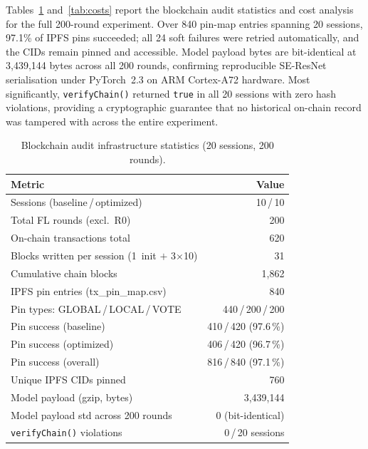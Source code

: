 \documentclass{llncs}
\begin{document}
Tables~\ref{tab:audit_stats} and~\ref{tab:costs} report the blockchain audit
statistics and cost analysis for the full 200-round experiment. Over 840
pin-map entries spanning 20 sessions, 97.1\% of IPFS pins succeeded; all 24 soft failures were retried automatically, and the CIDs remain pinned and
accessible. Model payload bytes are bit-identical at 3{,}439{,}144 bytes
across all 200 rounds, confirming reproducible SE-ResNet serialisation under
PyTorch~2.3 on ARM Cortex-A72 hardware. Most significantly, \texttt{verifyChain()}
returned \texttt{true} in all 20 sessions with zero hash violations, providing
a cryptographic guarantee that no historical on-chain record was tampered with
across the entire experiment.

\begin{table}[t]
\caption{Blockchain audit infrastructure statistics (20 sessions, 200 rounds).}
\label{tab:audit_stats}
\centering\footnotesize
\setlength{\tabcolsep}{4pt}
\begin{tabular}{lr}
\toprule
\textbf{Metric} & \textbf{Value} \\
\midrule
Sessions (baseline\,/\,optimized) & 10\,/\,10 \\
Total FL rounds (excl.\ R0) & 200 \\
On-chain transactions total & 620 \\
Blocks written per session (1~init $+$ 3$\times$10) & 31 \\
Cumulative chain blocks & 1{,}862 \\
\midrule
IPFS pin entries (tx\_pin\_map.csv) & 840 \\
Pin types: GLOBAL\,/\,LOCAL\,/\,VOTE & 440\,/\,200\,/\,200 \\
Pin success (baseline) & 410\,/\,420 (97.6\,\%) \\
Pin success (optimized) & 406\,/\,420 (96.7\,\%) \\
Pin success (overall) & 816\,/\,840 (97.1\,\%) \\
Unique IPFS CIDs pinned & 760 \\
Model payload (gzip, bytes) & 3{,}439{,}144 \\
Model payload std across 200 rounds & 0 (bit-identical) \\
\texttt{verifyChain()} violations & 0\,/\,20 sessions \\
\bottomrule
\end{tabular}
\end{table}
\end{document}
